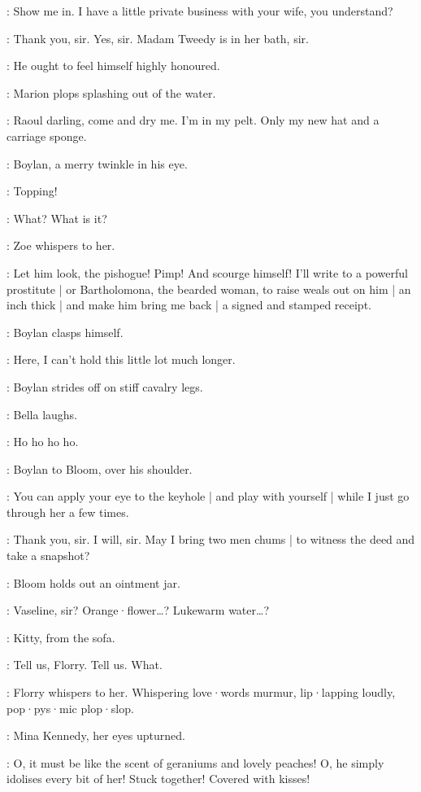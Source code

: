 \Boylan:
Show me in.
I have a little private business with your wife,
you understand?

\Bloom:
Thank you,
sir.
Yes,
sir.
Madam Tweedy is in her bath,
sir.

\Marion[5a]:
He ought to feel himself highly honoured.

:
Marion plops splashing out of the water.

\Marion:
Raoul darling,
come and dry me.
I'm in my pelt.
%
Only my new hat and a carriage sponge.

:
Boylan,
a merry twinkle in his eye.

\Boylan:
Topping!

\Bella:
What?
What is it?

:
Zoe whispers to her.

\Marion:
Let him look,
the pishogue!
Pimp!
And scourge himself!
I'll write to a powerful prostitute |
or Bartholomona,
the bearded woman,
to raise weals out on him |
an inch thick |
%
and make him bring me back |
a signed and stamped receipt.

:
Boylan clasps himself.

\Boylan:
Here,
I can't hold this little lot much longer.

:
Boylan strides off on stiff cavalry legs.

:
Bella laughs.

\Bella:
Ho ho ho ho.

:
Boylan to Bloom,
over his shoulder.

\Boylan:
You can apply your eye to the keyhole |
and play with yourself |
while I just go through her a few times.

\Bloom:
Thank you,
sir.
I will,
sir.
May I bring two men chums |
to witness the deed and take a snapshot?

:
Bloom holds out an ointment jar.

\Bloom:
Vaseline,
sir?
Orange·flower…?
Lukewarm water…?

:
Kitty,
from the sofa.

\Kitty:
Tell us,
Florry.
Tell us.
What.

:
Florry whispers to her.
Whispering love·words murmur,
lip·lapping loudly,
pop·pys·mic plop·slop.

:
Mina Kennedy,
her eyes upturned.

\MinaKennedy:
O,
it must be like the scent of geraniums and lovely peaches!
%
O,
he simply idolises every bit of her!
Stuck together!
Covered with kisses!


